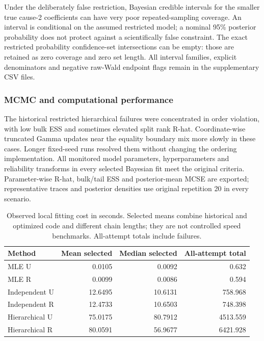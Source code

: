 Under the deliberately false restriction, Bayesian credible intervals for the smaller true cause-2 coefficients can have very poor repeated-sampling coverage. An interval is conditional on the assumed restricted model; a nominal 95\% posterior probability does not protect against a scientifically false constraint. The exact restricted probability confidence-set intersections can be empty: those are retained as zero coverage and zero set length. All interval families, explicit denominators and negative raw-Wald endpoint flags remain in the supplementary CSV files.

\subsubsection*{MCMC and computational performance}

The historical restricted hierarchical failures were concentrated in order violation, with low bulk ESS and sometimes elevated split rank R-hat. Coordinate-wise truncated Gamma updates near the equality boundary mix more slowly in these cases. Longer fixed-seed runs resolved them without changing the ordering implementation. All monitored model parameters, hyperparameters and reliability transforms in every selected Bayesian fit meet the original criteria. Parameter-wise R-hat, bulk/tail ESS and posterior-mean MCSE are exported; representative traces and posterior densities use original repetition 20 in every scenario.

\begin{table}[htbp]\centering\small

\caption{Observed local fitting cost in seconds. Selected means combine historical and optimized code and different chain lengths; they are not controlled speed benchmarks. All-attempt totals include failures.}

\begin{tabular}{lrrr}\hline Method & Mean selected & Median selected & All-attempt total\\\hline

MLE U & 0.0105 & 0.0092 & 0.632\\

MLE R & 0.0099 & 0.0086 & 0.594\\

Independent U & 12.6495 & 10.6131 & 758.968\\

Independent R & 12.4733 & 10.6503 & 748.398\\

Hierarchical U & 75.0175 & 80.7912 & 4513.559\\

Hierarchical R & 80.0591 & 56.9677 & 6421.928\\

\hline\end{tabular}\end{table}

